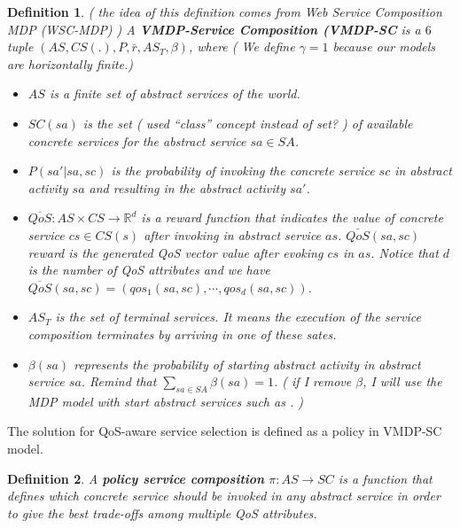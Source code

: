\documentclass{sigchi}
\newtheorem{definition}{Definition}
\begin{document}
\begin{definition}
({\color{blue} the idea of this definition comes from Web Service Composition MDP (WSC-MDP) \cite{DBLP:journals/tase/KhanoucheACKY16,Wang2010}}) A \textbf{VMDP-Service Composition (VMDP-SC} is a $6$ tuple $(AS, CS(.), P, \bar{r}, AS_T, \beta)$, where ({\color{red} We define $\gamma = 1$ because our models are horizontally finite.}) 

\begin{itemize}
\item[-] $AS$ is a finite set of abstract services of the world.
\item[-] $SC(sa)$ is the set ({ \color{red} \cite{DBLP:journals/tase/KhanoucheACKY16} used ``class'' concept instead of set? }) of available concrete services for the abstract service $sa \in SA$.
\item[-] $P(sa' |sa, sc )$ is the probability of invoking the concrete service $sc$ in abstract activity $sa$ and resulting in the abstract activity $sa'$.
\item[-] $ \overline{QoS}: AS \times CS \longrightarrow \mathbb{R}^d$ is a reward function that indicates the value of concrete service $cs \in CS(s)$ after invoking in abstract service $as$. $\bar{QoS}(sa, sc)$ reward is the generated QoS vector value after evoking $cs$ in $as$. Notice that $d$ is the number of QoS attributes and we have $\overline{QoS}(sa, sc) = (qos_1(sa,sc), \cdots, qos_d(sa,sc))$. 
\item[-] $AS_T$ is the set of terminal services. It means the execution of the service composition terminates by arriving in one of these sates.
\item[-] $\beta(sa)$ represents the probability of starting abstract activity in abstract service $sa$. Remind that $\sum_{sa \in SA} \beta(sa) = 1 $. ({\color{red} if I remove $\beta$, I will use the MDP model with start abstract services such as \cite{DBLP:journals/tase/KhanoucheACKY16}. })
\end{itemize}
\end{definition}

The solution for QoS-aware service selection is defined as a policy in VMDP-SC model.

\begin{definition}
A \textbf{policy service composition} $\pi: AS \longrightarrow SC$ is a function that defines which concrete service should be invoked in any abstract service in order to give the best trade-offs among multiple QoS attributes. 
\end{definition}
\end{document}
